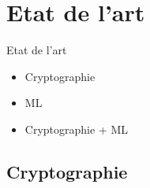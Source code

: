\documentclass{beamer}
\begin{document}
%
\section{Etat de l'art}
  


  \begin{frame}{Etat de l'art}

    \begin{itemize}
  \item {
    Cryptographie
  }
  \item {
    ML
  }
    \item {
    Cryptographie + ML
  }
  \end{itemize}
\end{frame}

  \subsection{Cryptographie}
  
\end{document}
